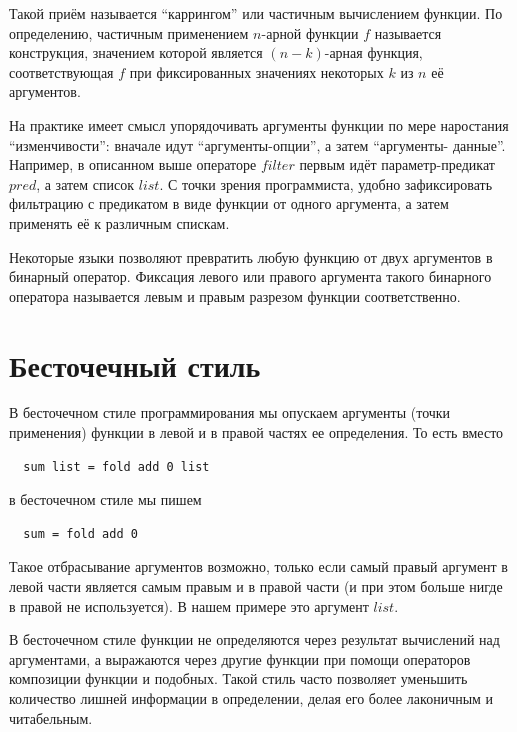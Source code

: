 \documentclass[a4paper,11pt]{article}
\begin{document}
Такой приём называется ``каррингом'' или частичным вычислением функции.
По определению, частичным применением $n$-арной функции $f$ называется 
конструкция, значением которой является $(n-k)$-арная функция, 
соответствующая $f$ при фиксированных значениях некоторых $k$ из $n$ её
аргументов. 

На практике имеет смысл упорядочивать аргументы функции по мере наростания
``изменчивости'': вначале идут ``аргументы-опции'', а затем ``аргументы-
данные''. Например, в описанном выше операторе $filter$ первым идёт
параметр-предикат $pred$, а затем список $list$. С точки зрения программиста,
удобно зафиксировать фильтрацию с предикатом в виде функции от одного 
аргумента, а затем применять её к различным спискам.

Некоторые языки позволяют превратить любую функцию от двух аргументов
в бинарный оператор. Фиксация левого или правого аргумента такого бинарного
оператора называется левым и правым разрезом функции соответственно.

\section{Бесточечный стиль}
В бесточечном стиле программирования мы опускаем аргументы (точки применения)
функции в левой и в правой частях ее определения. То есть вместо
\begin{lstlisting}
  sum list = fold add 0 list
\end{lstlisting}
в бесточечном стиле мы пишем
\begin{lstlisting}
  sum = fold add 0  
\end{lstlisting}

Такое отбрасывание аргументов возможно, только если самый правый аргумент в
левой части является самым правым и в правой части (и при этом больше нигде в
правой не используется). В нашем примере это аргумент $list$.

В бесточечном стиле функции не определяются через результат вычислений над 
аргументами, а выражаются через другие функции при помощи операторов композиции
функции и подобных. Такой стиль часто позволяет уменьшить количество лишней
информации в определении, делая его более лаконичным и читабельным.
\end{document}
